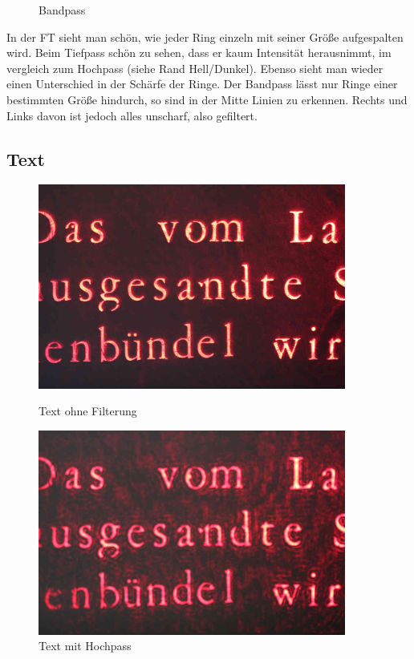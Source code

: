 \begin{figure}[H]
\begin{minipage}{0.33\textwidth}
                    \caption{Bandpass}
                  \end{minipage}
            \end{figure}
In der FT sieht man schön, wie jeder Ring einzeln mit seiner Größe aufgespalten wird. Beim Tiefpass schön zu sehen, dass er kaum Intensität herausnimmt, im vergleich zum Hochpass (siehe Rand Hell/Dunkel). Ebenso sieht man wieder einen Unterschied in der Schärfe der Ringe. Der Bandpass lässt nur Ringe einer bestimmten Größe hindurch, so sind in der Mitte Linien zu erkennen. Rechts und Links davon ist jedoch alles unscharf, also gefiltert.

        \subsection*{Text}
            \begin{figure}[H]
                  \begin{minipage}{0.45\textwidth}
                   \centering
                    \includegraphics[width=0.9\textwidth]{Abb/Abb_13.JPG}
                    \caption{Text ohne Filterung}
                  \end{minipage}\hfill
                  \begin{minipage}{0.45\textwidth}
                   \centering
                    \includegraphics[width=0.9\textwidth]{Abb/Abb_14.JPG}
                    \caption{Text mit Hochpass}
                  \end{minipage}
            \end{figure}
